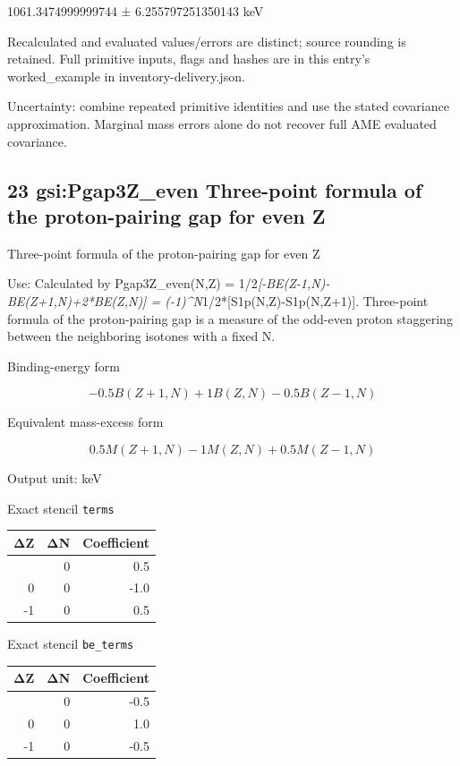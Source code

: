 \documentclass[
  11pt,
  letterpaper,
]{article}
\begin{document}
1061.3474999999744 ± 6.255797251350143 keV

Recalculated and evaluated values/errors are distinct; source rounding
is retained. Full primitive inputs, flags and hashes are in this entry's
worked\_example in inventory-delivery.json.

Uncertainty: combine repeated primitive identities and use the stated
covariance approximation. Marginal mass errors alone do not recover full
AME evaluated covariance.

\subsection{23 gsi:Pgap3Z\_even Three-point formula of the
proton-pairing gap for even
Z}\label{gsipgap3z_even-three-point-formula-of-the-proton-pairing-gap-for-even-z}

Three-point formula of the proton-pairing gap for even Z

Use: Calculated by Pgap3Z\_even(N,Z) =
1/2\emph{{[}-BE(Z-1,N)-BE(Z+1,N)+2*BE(Z,N){]} =
(-1)\^{}N}1/2*{[}S1p(N,Z)-S1p(N,Z+1){]}. Three-point formula of the
proton-pairing gap is a measure of the odd-even proton staggering
between the neighboring isotones with a fixed N.

Binding-energy form

\[
-0.5B(Z+1,N)+1B(Z,N)-0.5B(Z-1,N)
\]

Equivalent mass-excess form

\[
0.5M(Z+1,N)-1M(Z,N)+0.5M(Z-1,N)
\]

Output unit: keV

Exact stencil \texttt{terms}

\begin{longtable}[]{@{}rrr@{}}
\toprule\noalign{}
ΔZ & ΔN & Coefficient \\
\midrule\noalign{}
\endhead
\bottomrule\noalign{}
\endlastfoot
1 & 0 & 0.5 \\
0 & 0 & -1.0 \\
-1 & 0 & 0.5 \\
\end{longtable}

Exact stencil \texttt{be\_terms}

\begin{longtable}[]{@{}rrr@{}}
\toprule\noalign{}
ΔZ & ΔN & Coefficient \\
\midrule\noalign{}
\endhead
\bottomrule\noalign{}
\endlastfoot
1 & 0 & -0.5 \\
0 & 0 & 1.0 \\
-1 & 0 & -0.5 \\
\end{longtable}
\end{document}
